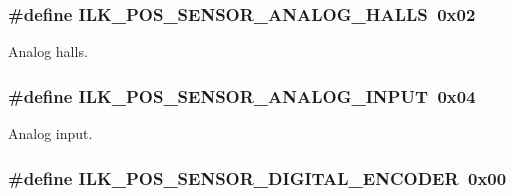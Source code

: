 \subsubsection[{\texorpdfstring{I\+L\+K\+\_\+\+P\+O\+S\+\_\+\+S\+E\+N\+S\+O\+R\+\_\+\+A\+N\+A\+L\+O\+G\+\_\+\+H\+A\+L\+LS}{ILK_POS_SENSOR_ANALOG_HALLS}}]{\setlength{\rightskip}{0pt plus 5cm}\#define I\+L\+K\+\_\+\+P\+O\+S\+\_\+\+S\+E\+N\+S\+O\+R\+\_\+\+A\+N\+A\+L\+O\+G\+\_\+\+H\+A\+L\+LS~0x02}\hypertarget{group__IL__CONST__POS__SENSOR_gad4226b47b6b8d3876a153a99d6ac6b22}{}\label{group__IL__CONST__POS__SENSOR_gad4226b47b6b8d3876a153a99d6ac6b22}


Analog halls. 

\subsubsection[{\texorpdfstring{I\+L\+K\+\_\+\+P\+O\+S\+\_\+\+S\+E\+N\+S\+O\+R\+\_\+\+A\+N\+A\+L\+O\+G\+\_\+\+I\+N\+P\+UT}{ILK_POS_SENSOR_ANALOG_INPUT}}]{\setlength{\rightskip}{0pt plus 5cm}\#define I\+L\+K\+\_\+\+P\+O\+S\+\_\+\+S\+E\+N\+S\+O\+R\+\_\+\+A\+N\+A\+L\+O\+G\+\_\+\+I\+N\+P\+UT~0x04}\hypertarget{group__IL__CONST__POS__SENSOR_ga9ad3cda1577a3d1a912a7b9fdff366d9}{}\label{group__IL__CONST__POS__SENSOR_ga9ad3cda1577a3d1a912a7b9fdff366d9}


Analog input. 

\subsubsection[{\texorpdfstring{I\+L\+K\+\_\+\+P\+O\+S\+\_\+\+S\+E\+N\+S\+O\+R\+\_\+\+D\+I\+G\+I\+T\+A\+L\+\_\+\+E\+N\+C\+O\+D\+ER}{ILK_POS_SENSOR_DIGITAL_ENCODER}}]{\setlength{\rightskip}{0pt plus 5cm}\#define I\+L\+K\+\_\+\+P\+O\+S\+\_\+\+S\+E\+N\+S\+O\+R\+\_\+\+D\+I\+G\+I\+T\+A\+L\+\_\+\+E\+N\+C\+O\+D\+ER~0x00}\hypertarget{group__IL__CONST__POS__SENSOR_ga9e22496d29b1c97487de0d32559d2492}{}\label{group__IL__CONST__POS__SENSOR_ga9e22496d29b1c97487de0d32559d2492}


